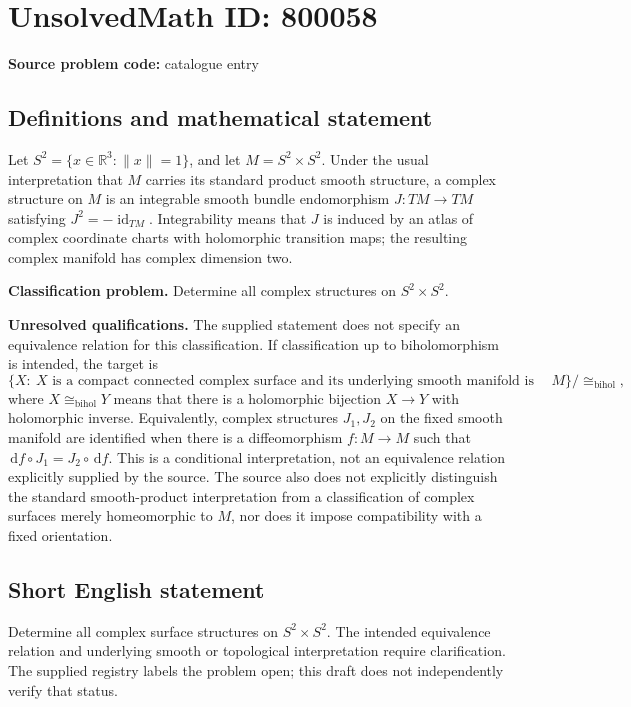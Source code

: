 \documentclass[11pt]{article}
\newcommand{\R}{\mathbb{R}}
\newcommand{\dd}{\,\mathrm{d}}
\begin{document}
\section*{UnsolvedMath ID: 800058}
\textbf{Source problem code:} catalogue entry
\subsection{Definitions and mathematical statement}
Let \(S^2=\{x\in\R^3:\|x\|=1\}\), and let \(M=S^2\times S^2\). Under the usual interpretation that \(M\) carries its standard product smooth structure, a complex structure on \(M\) is an integrable smooth bundle endomorphism \(J:TM\to TM\) satisfying \(J^2=-\operatorname{id}_{TM}\). Integrability means that \(J\) is induced by an atlas of complex coordinate charts with holomorphic transition maps; the resulting complex manifold has complex dimension two.

\textbf{Classification problem.} Determine all complex structures on \(S^2\times S^2\).

\textbf{Unresolved qualifications.} The supplied statement does not specify an equivalence relation for this classification. If classification up to biholomorphism is intended, the target is
\[
\bigl\{X:\ X\text{ is a compact connected complex surface and its underlying smooth manifold is diffeomorphic to }M\bigr\}/\cong_{\mathrm{bihol}},
\]
where \(X\cong_{\mathrm{bihol}}Y\) means that there is a holomorphic bijection \(X\to Y\) with holomorphic inverse. Equivalently, complex structures \(J_1,J_2\) on the fixed smooth manifold are identified when there is a diffeomorphism \(f:M\to M\) such that \(\dd f\circ J_1=J_2\circ\dd f\). This is a conditional interpretation, not an equivalence relation explicitly supplied by the source. The source also does not explicitly distinguish the standard smooth-product interpretation from a classification of complex surfaces merely homeomorphic to \(M\), nor does it impose compatibility with a fixed orientation.
\subsection{Short English statement}
Determine all complex surface structures on \(S^2\times S^2\). The intended equivalence relation and underlying smooth or topological interpretation require clarification. The supplied registry labels the problem open; this draft does not independently verify that status.
\end{document}
